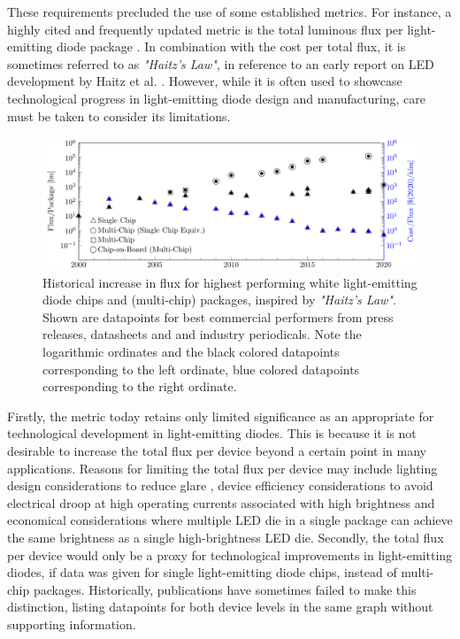 \documentclass[a4paper,nocompress]{spie}  %
\begin{document}
    These requirements precluded the use of some established metrics. For instance, a highly cited and frequently updated metric is the total luminous flux per light-emitting diode package \cite{Liu2009,haitz2011solid,cho2017white,Fontoynont2018}. In combination with the cost per total flux, it is sometimes referred to as \textit{"Haitz's Law"}, in reference to an early report on LED development by Haitz et al. \cite{haitz1999case}. However, while it is often used to showcase technological progress in light-emitting diode design and manufacturing, care must be taken to consider its limitations.
    
    \begin{figure} [ht]
        \begin{center}
            \includegraphics[width=\textwidth]{haitz_law_white.pdf}
        \end{center}
        \caption{Historical increase in flux for highest performing white light-emitting diode chips and (multi-chip) packages, inspired by \textit{"Haitz's Law"}\cite{haitz1999case}. Shown are datapoints for best commercial performers from press releases, datasheets and and industry periodicals. Note the logarithmic ordinates and the black colored datapoints corresponding to the left ordinate, blue colored datapoints corresponding to the right ordinate.}
        \label{fig:haitz}
    \end{figure}
    
    Firstly, the metric today retains only limited significance as an appropriate for technological development in light-emitting diodes. This is because it is not desirable to increase the total flux per device beyond a certain point in many applications. Reasons for limiting the total flux per device may include lighting design considerations to reduce glare \cite{khan2015led}, device efficiency considerations to avoid electrical droop at high operating currents associated with high brightness \cite{Piprek2010} and economical considerations where multiple LED die in a single package can achieve the same brightness as a single high-brightness LED die. Secondly, the total flux per device would only be a proxy for technological improvements in light-emitting diodes, if data was given for single light-emitting diode chips, instead of multi-chip packages. Historically, publications have sometimes failed to make this distinction, listing datapoints for both device levels in the same graph without supporting information.
\end{document}
